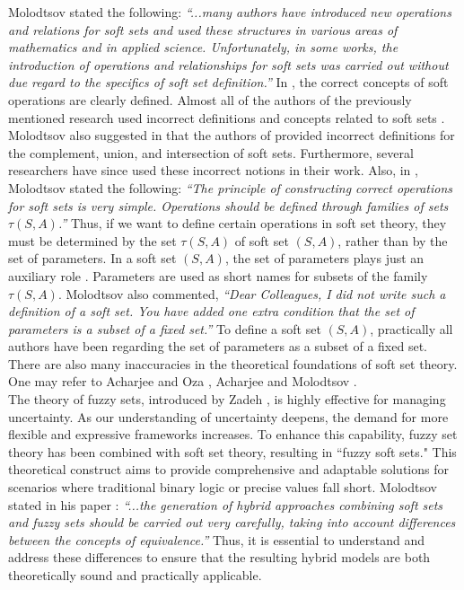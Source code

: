 \documentclass{article}
\theoremstyle{definition}
\begin{document}
Molodtsov \cite{3} stated the following: \textit{``...many authors have introduced new operations and relations for soft sets and used these structures in various areas of mathematics and in applied science. Unfortunately, in some works, the introduction of operations and relationships for soft sets was carried out without due regard to the specifics of soft set definition.”} In \cite{3}, the correct concepts of soft operations are clearly defined. Almost all of the authors of the previously mentioned research used incorrect definitions and concepts related to soft sets \cite{3}. Molodtsov also suggested in \cite{3} that the authors of \cite{7} provided incorrect definitions for the complement, union, and intersection of soft sets. Furthermore, several researchers have since used these incorrect notions in their work. Also, in \cite{2}, Molodtsov stated the following: \textit{``The principle of constructing correct operations for soft sets is very simple. Operations should be defined through families of sets $\tau(S,A)$.”} Thus, if we want to define certain operations in soft set theory, they must be determined by the set $\tau(S, A)$ of soft set $(S, A)$, rather than by the set of parameters. In a soft set $(S, A)$, the set of parameters plays just an auxiliary role \cite{2}. Parameters are used as short names for subsets of the family $\tau(S, A)$. Molodtsov \cite{4} also commented, \textit{``Dear Colleagues, I did not write such a definition of a soft set. You have added one extra condition that the set of parameters is a subset of a fixed set.”} To define a soft set $(S, A)$, practically all authors have been regarding the set of parameters as a subset of a fixed set. There are also many inaccuracies in the theoretical foundations of soft set theory. One may refer to Acharjee and Oza \cite{4}, Acharjee and Molodtsov \cite{24}.\\ 

The theory of fuzzy sets, introduced by Zadeh \cite{5}, is highly effective for managing uncertainty. As our understanding of uncertainty deepens, the demand for more flexible and expressive frameworks increases. To enhance this capability, fuzzy set theory has been combined with soft set theory, resulting in ``fuzzy soft sets." This theoretical construct aims to provide comprehensive and adaptable solutions for scenarios where traditional binary logic or precise values fall short. Molodtsov stated in his paper \cite{3}: \textit{``...the generation of hybrid approaches combining soft sets and fuzzy sets should be carried out very carefully, taking into account differences between the concepts of equivalence.”} Thus, it is essential to understand and address these differences to ensure that the resulting hybrid models are both theoretically sound and practically applicable. \\
\end{document}
